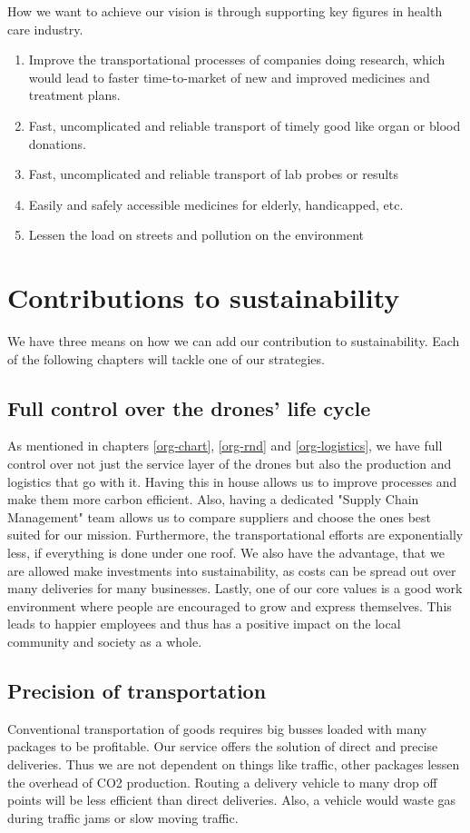 How we want to achieve our vision is through supporting key figures in health care industry.
\begin{enumerate}
  \item Improve the transportational processes of companies doing research, which would lead to faster time-to-market of new and improved medicines and treatment plans.
  \item Fast, uncomplicated and reliable transport of timely good like organ or blood donations.
  \item Fast, uncomplicated and reliable transport of lab probes or results
  \item Easily and safely accessible medicines for elderly, handicapped, etc.
  \item Lessen the load on streets and pollution on the environment
\end{enumerate}

\section{Contributions to sustainability}
We have three means on how we can add our contribution to sustainability. Each of the following chapters will tackle one of our strategies.
\subsection{Full control over the drones' life cycle}
As mentioned in chapters \ref{org-chart}, \ref{org-rnd} and \ref{org-logistics}, we have full control over not just the service layer of the drones but also the production and logistics that go with it.
\newline
Having this in house allows us to improve processes and make them more carbon efficient. Also, having a dedicated "Supply Chain Management" team allows us to compare suppliers and choose the ones best suited for our mission. Furthermore, the transportational efforts are exponentially less, if everything is done under one roof.
\newline
We also have the advantage, that we are allowed make investments into sustainability, as costs can be spread out over many deliveries for many businesses.
\newline
Lastly, one of our core values is a good work environment where people are encouraged to grow and express themselves. This leads to happier employees and thus has a positive impact on the local community and society as a whole.
\subsection{Precision of transportation}
Conventional transportation of goods requires big busses loaded with many packages to be profitable. Our service offers the solution of direct and precise deliveries. Thus we are not dependent on things like traffic, other packages lessen the overhead of CO2 production. Routing a delivery vehicle to many drop off points will be less efficient than direct deliveries. Also, a vehicle would waste gas during traffic jams or slow moving traffic.
